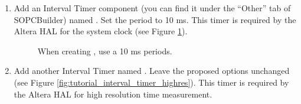 \begin{enumerate}
\item Add an Interval Timer component (you can find it under the
  ``Other'' tab of SOPCBuilder) named . Set the
  period to 10 ms. This timer is required by the Altera HAL for the
  system clock (see Figure \ref{fig:tutorial_sys_clk_timer}).
%
\begin{figure}

\caption{\label{fig:tutorial_sys_clk_timer}When creating
, use a 10 ms periods.}
\end{figure}

\item Add another Interval Timer named . Leave
  the proposed options unchanged (see Figure
  \ref{fig:tutorial_interval_timer_highres}). This timer is required
  by the Altera HAL for high resolution time measurement.
%
\begin{figure}


\end{figure}
\end{enumerate}

